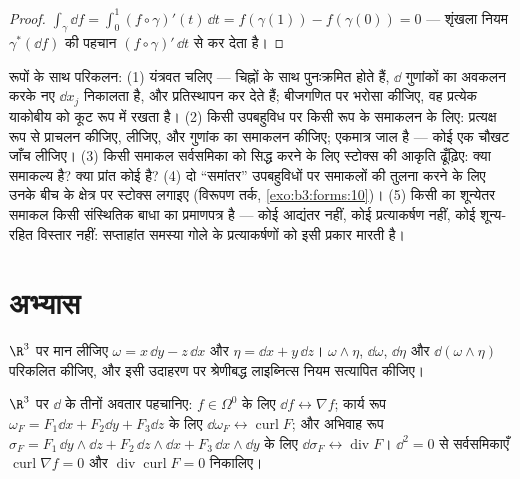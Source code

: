 \begin{proof}
$\int_\gamma\dd f = \int_0^1(f\circ\gamma)'(t)\,\dd t =
f(\gamma(1)) - f(\gamma(0)) = 0$ --- शृंखला नियम $\gamma^*(\dd f)$ की पहचान $(f\circ\gamma)'\,\dd t$ से कर देता है।
\end{proof}

\begin{method}\label{met:b3:forms:method}
रूपों के साथ परिकलन: (1) यंत्रवत चलिए ---  चिह्नों के
साथ पुनःक्रमित होते हैं, $\dd$ गुणांकों का अवकलन करके नए $\dd
x_j$
निकालता है, और  प्रतिस्थापन कर देते हैं; बीजगणित पर
भरोसा कीजिए, वह प्रत्येक याकोबीय को कूट रूप में रखता है। (2) किसी
उपबहुविध पर किसी रूप के समाकलन के लिए: प्रत्यक्ष रूप से प्राचलन
कीजिए,  लीजिए, और गुणांक का समाकलन कीजिए; एकमात्र जाल
 है --- कोई एक चौखट जाँच लीजिए। (3) किसी समाकल सर्वसमिका
को सिद्ध करने के लिए स्टोक्स की आकृति ढूँढ़िए: क्या समाकल्य
 है? क्या प्रांत कोई  है? (4) दो ``समांतर''
उपबहुविधों पर समाकलों की तुलना करने के लिए उनके बीच के क्षेत्र पर
स्टोक्स लगाइए (विरूपण तर्क, \cref{exo:b3:forms:10})। (5) किसी  का
शून्येतर समाकल किसी संस्थितिक बाधा का प्रमाणपत्र है --- कोई
आद्यंतर नहीं, कोई प्रत्याकर्षण नहीं, कोई शून्य-रहित विस्तार नहीं:
सप्ताहांत समस्या गोले के प्रत्याकर्षणों को इसी प्रकार मारती है।
\end{method}

\section{अभ्यास}

\begin{exercise}[$\star$]\label{exo:b3:forms:1}
$\R^3$ पर मान लीजिए $\omega = x\,\dd y - z\,\dd x$ और $\eta =
\dd x + y\,\dd z$। $\omega\wedge\eta$, $\dd\omega$, $\dd\eta$ और $\dd(\omega\wedge\eta)$
परिकलित कीजिए, और इसी उदाहरण पर श्रेणीबद्ध लाइब्नित्स नियम
सत्यापित कीजिए।
\end{exercise}

\begin{exercise}[$\star$]\label{exo:b3:forms:2}
$\R^3$ पर $\dd$ के तीनों अवतार पहचानिए: $f \in \Omega^0$ के लिए $\dd f \leftrightarrow \nabla f$; कार्य
रूप $\omega_F = F_1\dd x + F_2\dd y + F_3\dd z$ के लिए $\dd\omega_F \leftrightarrow \operatorname{curl}F$; और अभिवाह रूप $\sigma_F = F_1\,\dd y\wedge\dd z + F_2\,\dd
z\wedge\dd x + F_3\,\dd x\wedge\dd y$ के लिए $\dd\sigma_F
\leftrightarrow \operatorname{div}F$। $\dd^2 =
0$
से सर्वसमिकाएँ $\operatorname{curl}\nabla f = 0$ और $\operatorname{div}\operatorname{curl}F = 0$ निकालिए।
\end{exercise}

